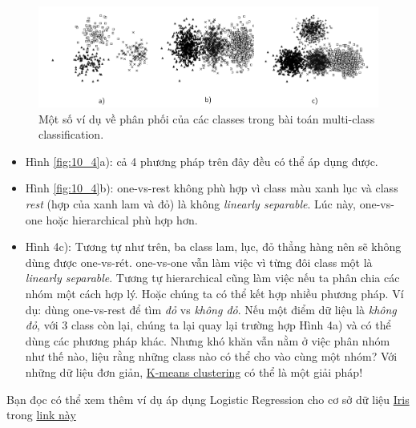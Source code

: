 \begin{figure}[t]
\centering
    \includegraphics[width = \textwidth]{Chapters/05_NeuralNetworks/12_binaryclassifiers/latex/dist.pdf}
    \caption[]{Một số ví dụ về phân phối của các classes trong bài toán multi-class classification.}
    \label{fig:10_4}
\end{figure}
\begin{itemize}
\item Hình \eqref{fig:10_4}a): cả 4 phương pháp trên đây đều có thể áp dụng được. 
 
\item Hình \eqref{fig:10_4}b): one-vs-rest không phù hợp vì class màu xanh lục và class \textit{rest} (hợp của xanh lam và đỏ) là không \textit{linearly separable}. Lúc này, one-vs-one hoặc hierarchical phù hợp hơn.  
 
\item Hình 4c): Tương tự như trên, ba class lam, lục, đỏ thẳng hàng nên sẽ không dùng được one-vs-rét. one-vs-one vẫn làm việc vì từng đôi class một là \textit{linearly separable}. Tương tự hierarchical cũng làm việc nếu ta phân chia các nhóm một cách hợp lý. Hoặc chúng ta có thể kết hợp nhiều phương pháp. Ví dụ: dùng one-vs-rest để tìm \textit{đỏ} vs \textit{không đỏ}. Nếu một điểm dữ liệu là \textit{không đỏ}, với 3 class còn lại, chúng ta lại quay lại trường hợp Hình 4a) và có thể dùng các phương pháp khác. Nhưng khó khăn vẫn nằm ở việc phân nhóm như thế nào, liệu rằng những class nào có thể cho vào cùng một nhóm? Với những dữ liệu đơn giản, \href{http://machinelearningcoban.com/2017/01/01/kmeans/}{K-means clustering} có thể là một giải pháp! 
\end{itemize}
 
Bạn đọc có thể xem thêm ví dụ áp dụng Logistic Regression cho cơ sở dữ liệu \href{http://machinelearningcoban.com/2017/01/08/knn/#bo-co-so-du-lieu-iris-iris-flower-dataset}{Iris} trong \href{http://scikit-learn.org/stable/auto_examples/linear_model/plot_iris_logistic.html}{link này} 
 
